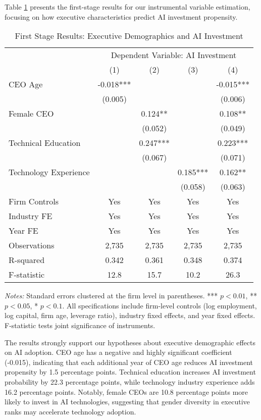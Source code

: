 \documentclass[12pt, a4paper]{article}
\begin{document}
Table \ref{tab:first_stage} presents the first-stage results for our instrumental variable estimation, focusing on how executive characteristics predict AI investment propensity.

\begin{table}[H]
\centering
\caption{First Stage Results: Executive Demographics and AI Investment}
\label{tab:first_stage}
\begin{tabular}{lcccc}
\toprule
 & \multicolumn{4}{c}{Dependent Variable: AI Investment} \\
 & (1) & (2) & (3) & (4) \\
\midrule
CEO Age & -0.018*** & & & -0.015*** \\
 & (0.005) & & & (0.006) \\
Female CEO & & 0.124** & & 0.108** \\
 & & (0.052) & & (0.049) \\
Technical Education & & 0.247*** & & 0.223*** \\
 & & (0.067) & & (0.071) \\
Technology Experience & & & 0.185*** & 0.162** \\
 & & & (0.058) & (0.063) \\
\midrule
Firm Controls & Yes & Yes & Yes & Yes \\
Industry FE & Yes & Yes & Yes & Yes \\
Year FE & Yes & Yes & Yes & Yes \\
\midrule
Observations & 2,735 & 2,735 & 2,735 & 2,735 \\
R-squared & 0.342 & 0.361 & 0.348 & 0.374 \\
F-statistic & 12.8 & 15.7 & 10.2 & 26.3 \\
\bottomrule
\end{tabular}
\begin{minipage}{\textwidth}
\footnotesize
\textit{Notes:} Standard errors clustered at the firm level in parentheses. *** $p<0.01$, ** $p<0.05$, * $p<0.1$. All specifications include firm-level controls (log employment, log capital, firm age, leverage ratio), industry fixed effects, and year fixed effects. F-statistic tests joint significance of instruments.
\end{minipage}
\end{table}

The results strongly support our hypotheses about executive demographic effects on AI adoption. CEO age has a negative and highly significant coefficient (-0.015), indicating that each additional year of CEO age reduces AI investment propensity by 1.5 percentage points. Technical education increases AI investment probability by 22.3 percentage points, while technology industry experience adds 16.2 percentage points. Notably, female CEOs are 10.8 percentage points more likely to invest in AI technologies, suggesting that gender diversity in executive ranks may accelerate technology adoption.
\end{document}
